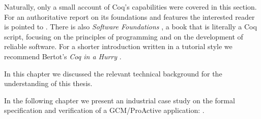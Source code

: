 	



	Naturally, only a small account of Coq's capabilities were covered in this section. For an authoritative 
	report on its foundations and features the interested reader is pointed to \cite{opac-b1101046}.
	There is also \textit{Software Foundations}	\cite{Pierce:SF}, a book that is literally a Coq script, 
	focusing on the principles of programming and on the development of reliable software.
	For a shorter introduction written in a tutorial style we recommend Bertot's \textit{Coq in a Hurry}
	 \cite{DBLP:journals/corr/abs-cs-0603118}.




	\chapbreak
	
	In this chapter we discussed the relevant technical background for the understanding of this thesis.
	
			In the following chapter we present an industrial case study on the formal specification and verification
	of a \ac{GCM}/ProActive application: \thehm. 
		
	
	


